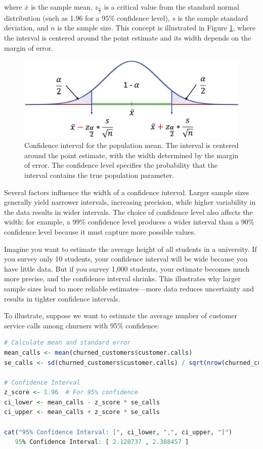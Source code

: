 \documentclass[
]{book}
\theoremstyle{definition}
\theoremstyle{definition}
\theoremstyle{definition}
\theoremstyle{definition}
\theoremstyle{remark}
\begin{document}
where \(\bar{x}\) is the sample mean, \(z_{\frac{\alpha}{2}}\) is a critical value from the standard normal distribution (such as 1.96 for a 95\% confidence level), \(s\) is the sample standard deviation, and \(n\) is the sample size. This concept is illustrated in Figure \ref{fig:confidence-interval}, where the interval is centered around the point estimate and its width depends on the margin of error.

\begin{figure}

{\centering \includegraphics[width=0.8\linewidth]{images/ch5_confidence_interval} 

}

\caption{Confidence interval for the population mean. The interval is centered around the point estimate, with the width determined by the margin of error. The confidence level specifies the probability that the interval contains the true population parameter.}\label{fig:confidence-interval}
\end{figure}

Several factors influence the width of a confidence interval. Larger sample sizes generally yield narrower intervals, increasing precision, while higher variability in the data results in wider intervals. The choice of confidence level also affects the width; for example, a 99\% confidence level produces a wider interval than a 90\% confidence level because it must capture more possible values.

Imagine you want to estimate the average height of all students in a university. If you survey only 10 students, your confidence interval will be wide because you have little data. But if you survey 1,000 students, your estimate becomes much more precise, and the confidence interval shrinks. This illustrates why larger sample sizes lead to more reliable estimates---more data reduces uncertainty and results in tighter confidence intervals.

To illustrate, suppose we want to estimate the average number of customer service calls among churners with 95\% confidence:

\begin{lstlisting}[language=R]
# Calculate mean and standard error
mean_calls <- mean(churned_customers$customer.calls)
se_calls <- sd(churned_customers$customer.calls) / sqrt(nrow(churned_customers))

# Confidence Interval
z_score <- 1.96  # For 95% confidence
ci_lower <- mean_calls - z_score * se_calls
ci_upper <- mean_calls + z_score * se_calls

cat("95% Confidence Interval: [", ci_lower, ",", ci_upper, "]")
   95% Confidence Interval: [ 2.120737 , 2.388457 ]
\end{lstlisting}
\end{document}
